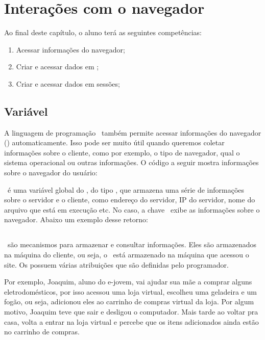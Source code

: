 \chapter{Interações com o navegador}
\label{interacoes-com-o-navegador}

Ao final deste capítulo, o aluno terá as seguintes competências:
\begin{enumerate}
    \item Acessar informações do navegador;
    \item Criar e acessar dados em \cookies;
    \item Criar e acessar dados em sessões;
\end{enumerate}

\section{Variável \variavelserver}
\label{variavel-server}

A linguagem de programação \php~também permite acessar informações do navegador 
(\browser) automaticamente. Isso pode ser muito útil quando queremos coletar 
informações sobre o cliente, como por exemplo, o tipo de navegador, qual o 
sistema operacional ou outras informações. O código a seguir mostra informações 
sobre o navegador do usuário:



\variavelserver~é uma variável global do \php, do tipo \tipoarray, que armazena uma série 
de informações sobre o servidor e o cliente, como endereço do servidor, IP do servidor, 
nome do arquivo que está em execução etc. No caso, a chave \chavehttp~exibe as informações 
sobre o navegador. Abaixo um exemplo desse retorno:

\section{\titulocookies}
\label{cookies}

\cookies~são mecanismos para armazenar e consultar informações. Eles são armazenados na máquina 
do cliente, ou seja, o \cookie~está armazenado na máquina que acessou o site. Os \cookies possuem várias 
atribuições que são definidas pelo programador.

Por exemplo, Joaquim, aluno do e-jovem, vai ajudar sua mãe a comprar alguns eletrodomésticos, 
por isso acessou uma loja virtual, escolheu uma geladeira e um fogão, ou seja, adicionou eles ao 
carrinho de compras virtual da loja. Por algum motivo, Joaquim teve que sair e desligou o computador. 
Mais tarde ao voltar pra casa, volta a entrar na loja virtual e percebe que os itens adicionados 
ainda estão no carrinho de compras.

